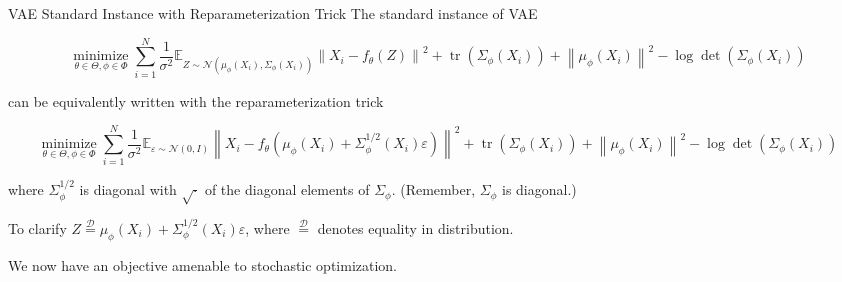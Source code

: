 \begin{frame}[allowframebreaks]

\begin{myconceptblock}{11.18}{VAE Standard Instance with Reparameterization Trick}
    The standard instance of VAE

    $$
    \underset{\theta \in \Theta, \phi \in \Phi}{\operatorname{minimize}} \sum_{i=1}^{N} \frac{1}{\sigma^{2}} \mathbb{E}_{Z \sim \mathcal{N}\left(\mu_{\phi}\left(X_{i}\right), \Sigma_{\phi}\left(X_{i}\right)\right)}\left\|X_{i}-f_{\theta}(Z)\right\|^{2}+\operatorname{tr}\left(\Sigma_{\phi}\left(X_{i}\right)\right)+\left\|\mu_{\phi}\left(X_{i}\right)\right\|^{2}-\log \operatorname{det}\left(\Sigma_{\phi}\left(X_{i}\right)\right)
    $$

    can be equivalently written with the reparameterization trick

    $$
    \underset{\theta \in \Theta, \phi \in \Phi}{\operatorname{minimize}} \sum_{i=1}^{N} \frac{1}{\sigma^{2}} \mathbb{E}_{\varepsilon \sim \mathcal{N}(0, I)}\left\|X_{i}-f_{\theta}\left(\mu_{\phi}\left(X_{i}\right)+\Sigma_{\phi}^{1 / 2}\left(X_{i}\right) \varepsilon\right)\right\|^{2}+\operatorname{tr}\left(\Sigma_{\phi}\left(X_{i}\right)\right)+\left\|\mu_{\phi}\left(X_{i}\right)\right\|^{2}-\log \operatorname{det}\left(\Sigma_{\phi}\left(X_{i}\right)\right)
    $$

    where $\Sigma_{\phi}^{1 / 2}$ is diagonal with $\sqrt{\cdot}$ of the diagonal elements of $\Sigma_{\phi}$.
    (Remember, $\Sigma_{\phi}$ is diagonal.)

    To clarify $Z \stackrel{\mathcal{D}}{=} \mu_{\phi}\left(X_{i}\right)+\Sigma_{\phi}^{1 / 2}\left(X_{i}\right) \varepsilon$, where $\stackrel{\mathcal{D}}{=}$ denotes equality in distribution.

    We now have an objective amenable to stochastic optimization.
\end{myconceptblock}

\end{frame}

